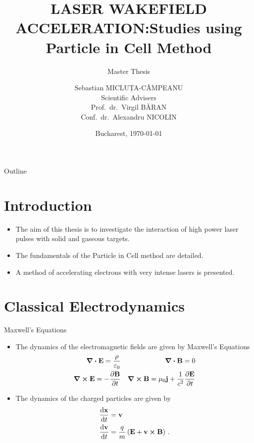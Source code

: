 \documentclass{beamer}
\title{LASER WAKEFIELD ACCELERATION:\@ Studies using Particle in Cell Method}
\subtitle{Master Thesis}
\date{Bucharest, \today}
\author{Sebastian MICLUȚA-CÂMPEANU\\
Scientific Advisers\\
Prof.~dr.~Virgil BĂRAN \\
Conf.~dr.~Alexandru NICOLIN}
\institute{University of Bucharest}
\begin{document}
\maketitle%


\begin{frame}{Outline}
  \tableofcontents[]
\end{frame}

\section{Introduction}


\begin{frame}
  \begin{itemize}
	\item The aim of this thesis is to investigate the interaction of high power
	laser pulses with solid and gaseous targets.
    \item The fundamentals of the Particle in Cell method are detailed.
	\item A method of accelerating electrons with very intense lasers is presented.
  \end{itemize}
\end{frame}

\section{Classical Electrodynamics}

\begin{frame}{Maxwell's Equations}
	\begin{itemize}
		\item The dynamics of the electromagnetic fields are given by Maxwell's Equations
		\begin{subequations}%
		  \begin{align*}
		    \div{\vb{E}}  = \frac{\rho}{\varepsilon_0} &&
		    \div{\vb{B}}  = 0  \\
		    \curl{\vb{E}}  = - \pdv{\vb{B}}{t} &&
		    \curl{\vb{B}}  = \mu_0 \vb{j} + \frac{1}{c^2} \pdv{\vb{E}}{t}
		  \end{align*}
		\end{subequations}
		\item The dynamics of the charged particles are given by
		\begin{align*}
		  \dv{\vb{x}}{t} &= \vb{v} \\
		  \dv{\vb{v}}{t} &= \frac{q}{m} \left(\vb{E} + \vb{v}\cp\vb{B}\right)\,.
		\end{align*}
	\end{itemize}
\end{frame}
\end{document}
